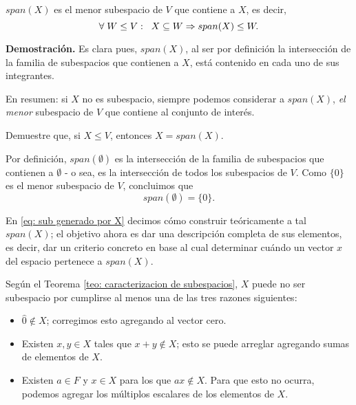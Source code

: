 \begin{prop}
$span (X)$ es el menor subespacio de $V$
que contiene a $X$, es decir,
\[
\forall \hspace{0.1cm} W \leq V: \hspace{0.2cm}
X \subseteq W \Rightarrow span (X) \leq W.
\]
\end{prop}
\noindent
\textbf{Demostración.}
Es clara pues, $span (X)$, al ser por definición
la intersección de la familia de subespacios que
contienen a $X$, está contenido en cada uno de sus integrantes.

\QEDB
\vspace{0.2cm}

En resumen: si $X$ no es subespacio, siempre podemos
considerar a $span (X)$, \textit{el menor}
subespacio de $V$ que contiene al conjunto de interés.

 Demuestre que, si $X \leq V$,
entonces $X = span (X)$.

\begin{obs}
Por definición,
$span (\emptyset)$ es la intersección 
de la familia de subespacios que contienen a 
$\emptyset$ - o sea, es la intersección de todos los subespacios
de $V$. Como $\{ 0 \}$ es el menor subespacio de $V$, concluimos que
\[
span (\emptyset)= \{ 0 \}.
\] 
\end{obs}

En \eqref{eq: sub generado por X} decimos cómo
construir teóricamente a tal $span (X)$; el objetivo ahora es dar
una descripción completa de sus elementos, es decir,
dar un criterio concreto en base al cual determinar
cuándo un vector $x$ del espacio pertenece a 
$span (X)$.

Según el Teorema \ref{teo: caracterizacion de subespacios}, 
$X$ puede no ser subespacio
por cumplirse al menos una de las tres razones siguientes:
\begin{itemize}
	\item $\hat{0} \not\in X$; corregimos esto agregando
	al vector cero.
	\item Existen $x, y \in X$ tales que 
	$x+y \not\in X$; esto se puede arreglar agregando
	sumas de elementos de $X$.
	\item Existen $a \in F$ y $x \in X$ para los que
	$ax \not\in X$. Para que esto no ocurra, podemos 
	agregar los múltiplos escalares de los elementos de $X$.
\end{itemize}

